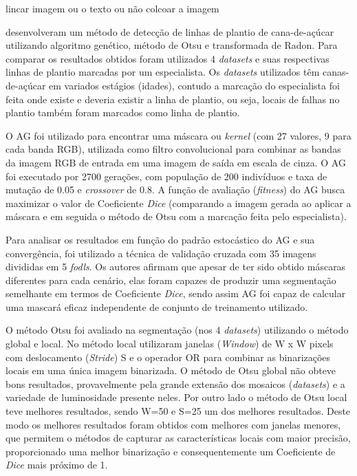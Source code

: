 \documentclass[12pt, a4paper, english, brazil]{article}
\newcommand{\textRed}[1]{{{\color{red} #1}}}
\begin{document}
\textRed{lincar imagem ou o texto ou não colcoar a imagem}

 desenvolveram um método de detecção de linhas de plantio de cana-de-açúcar utilizando algoritmo genético, método de Otsu e transformada de Radon. Para comparar os resultados obtidos foram utilizados 4 \textit{datasets} e suas respectivas linhas de plantio marcadas por um especialista. Os \textit{datasets} utilizados têm canas-de-açúcar em variados estágios (idades), \textRed{contudo} a marcação do especialista foi feita onde existe e deveria existir a linha de plantio, ou seja, locais de falhas no plantio também foram marcados como linha de plantio.

O AG foi utilizado para encontrar uma máscara ou \textit{kernel} (com 27 valores, 9 para cada banda RGB), utilizada como filtro convolucional para combinar as bandas da imagem RGB de entrada em uma imagem de saída em escala de cinza. O AG foi executado por 2700 gerações, com população de 200 indivíduos e taxa de mutação de 0.05 e \textit{crossover} de 0.8. A função de avaliação (\textit{fitness}) do AG busca maximizar o valor de Coeficiente \textit{Dice} (comparando a imagem gerada ao aplicar a máscara e em seguida o método de Otsu com a marcação feita pelo especialista).

Para analisar os resultados em função do padrão estocástico do AG e sua convergência, foi utilizado a técnica de validação cruzada com 35 imagens divididas em 5 \textit{fodls}. Os autores afirmam que apesar de ter sido obtido máscaras diferentes para cada cenário, elas foram capazes de produzir uma segmentação semelhante em termos de Coeficiente \textit{Dice}, sendo assim AG foi capaz de calcular uma mascará eficaz independente de conjunto de treinamento utilizado.

O método Otsu foi avaliado na segmentação (nos 4 \textit{datasets}) utilizando o método global e local. No método local utilizaram janelas (\textit{Window}) de W x W pixels com deslocamento (\textit{Stride}) S e o operador OR para combinar as binarizações locais em uma única imagem binarizada. O método de Otsu global não obteve bons resultados, provavelmente pela grande extensão dos mosaicos (\textit{datasets}) e a variedade de luminosidade presente neles. Por outro lado o método de Otsu local teve melhores resultados, sendo W=50 e S=25 um dos melhores resultados. Deste modo os melhores resultados foram obtidos com melhores com janelas menores, que permitem o métodos de capturar as características locais com maior precisão, proporcionado uma melhor binarização e consequentemente um Coeficiente de \textit{Dice} mais próximo de 1.
\end{document}
